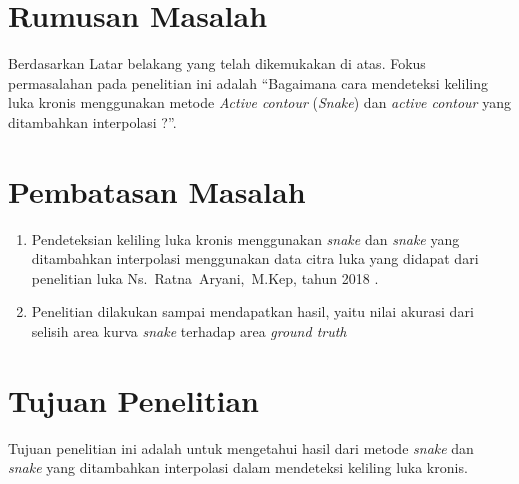 \section{Rumusan Masalah}
Berdasarkan Latar belakang yang telah dikemukakan di atas. Fokus permasalahan pada penelitian ini adalah “Bagaimana cara mendeteksi keliling luka kronis menggunakan metode \emph{Active contour} (\emph{Snake}) dan \emph{active contour} yang ditambahkan interpolasi ?”.

\section{Pembatasan Masalah}
\begin{enumerate}
	\item Pendeteksian keliling luka kronis menggunakan \emph{snake} dan \emph{snake} yang ditambahkan interpolasi menggunakan data citra luka yang didapat dari penelitian luka \mbox{Ns. Ratna Aryani, M.Kep}, tahun 2018 \mbox{\citep{ratna2018rancang}}.
	\item Penelitian dilakukan sampai mendapatkan hasil, yaitu nilai akurasi dari selisih area kurva \emph{snake} terhadap area \emph{ground truth}
\end{enumerate}

\section{Tujuan Penelitian}
Tujuan penelitian ini adalah untuk mengetahui hasil dari metode \emph{snake} dan \emph{snake} yang ditambahkan interpolasi dalam mendeteksi keliling luka kronis.

